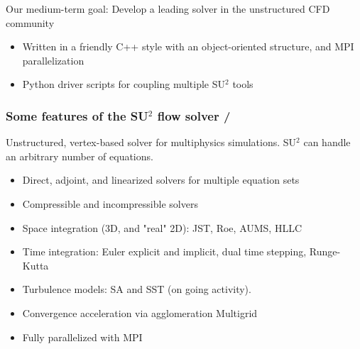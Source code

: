\documentclass[handout,table]{beamer}
\begin{document}
\begin{frame}[t]
\pause

\begin{block}{}
Our medium-term goal: Develop a \textcolor{cardinal}{leading solver in the unstructured CFD community}
\end{block}

\pause

\begin{itemize}
\item Written in a \textcolor{cardinal}{friendly C++ style with an object-oriented structure}, and MPI parallelization
\item Python driver scripts for coupling multiple SU$^2$ tools
\end{itemize}

\end{frame}

\begin{frame}[t]
\frametitle{Some features of the SU$^2$ flow solver \hfill  \small{ \insertframenumber/\inserttotalframenumber} }

\begin{block}{}
\textcolor{cardinal}{Unstructured, vertex-based solver for multiphysics simulations}. SU$^2$ can handle an arbitrary number of equations.
\end{block}

\begin{itemize}
\item<2-> Direct, adjoint, and linearized solvers for multiple equation sets
\item<3-> Compressible and incompressible solvers
\item<4-> Space integration (3D, and "real" 2D): JST, Roe, AUMS, HLLC
\item<5-> Time integration: Euler explicit and implicit, dual time stepping, Runge-Kutta
\item<6-> Turbulence models: SA and SST (on going activity).
\item<7-> Convergence acceleration via agglomeration Multigrid
\item<8-> Fully parallelized with MPI
\end{itemize}

\end{frame}
\end{document}
